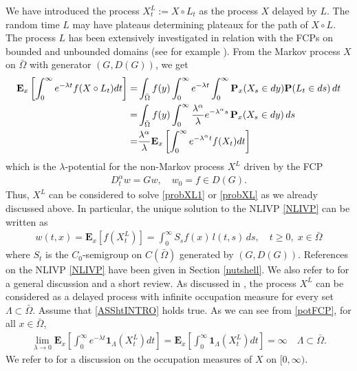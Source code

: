 \documentclass[11pt,a4paper]{article}
\begin{document}
We have introduced the process $X^L_t := X \circ L_t$ as the process $X$ delayed by $L$. The random time $L$ may have plateaus determining plateaux for the path of $X\circ L$. The process $L$ has been extensively investigated in relation with the FCPs on bounded and unbounded domains (see for example \cite{MNV09, Chen17}). From the Markov process $X$ on $\bar{\Omega}$ with generator $(G, D(G))$, we get 
\begin{align}
\label{potFCP}
\mathbf{E}_x\left[\int_0^\infty e^{-\lambda t} f(X \circ L_t) dt \right]
= & \int_{\bar{\Omega}} f(y) \int_0^\infty e^{-\lambda t} \int_0^\infty \mathbf{P}_x(X_s \in dy) \mathbf{P}(L_t \in ds)\, dt\notag \\
= & \int_{\bar{\Omega}} f(y)  \int_0^\infty \frac{\lambda^\alpha}{\lambda} e^{-\lambda^\alpha s}\, \mathbf{P}_x(X_s \in dy) \, ds \notag \\
= & \frac{\lambda^\alpha}{\lambda} \mathbf{E}_x \left[ \int_0^\infty e^{-\lambda^\alpha t} f(X_t) dt \right]
\end{align}
which is the $\lambda$-potential for the non-Markov process $X^L$ driven by the FCP 
\begin{align}
\label{NLIVP}
D^\alpha_t w = G w, \quad w_0 = f \in D(G).
\end{align}
Thus, $X^L$ can be considered to solve \eqref{probXL1} or \eqref{probXL} as we already discussed above. In particular, the unique solution to the NLIVP  \eqref{NLIVP} can be written as
\begin{align*}
w(t,x) = \mathbf{E}_x[f(X^L_t)] = \int_0^\infty S_s f(x)\, l(t,s)\,ds, \quad t\geq 0,\; x \in \bar{\Omega}
\end{align*}
where $S_t$ is the $C_0$-semigroup on $C(\bar{\Omega})$ generated by $(G,D(G))$. References on the NLIVP \eqref{NLIVP} have been given in Section \ref{nutshell}. We also refer to \cite{CapDovFEforms19} for a general discussion and a short review. As discussed in \cite{CapDovDelRus17}, the process $X^L$ can be considered as a delayed process with infinite occupation measure for every set $\Lambda \subset \bar{\Omega}$. Assume that \eqref{ASShtINTRO} holds true. As we can see from \eqref{potFCP}, for all $x \in \bar{\Omega}$,
\begin{align}
\lim_{\lambda \to 0} \mathbf{E}_x \left[ \int_0^\infty e^{-\lambda t}\mathbf{1}_\Lambda(X^L_t) dt \right] = \mathbf{E}_x \left[ \int_0^\infty \mathbf{1}_\Lambda(X^L_t) dt \right] = \infty \quad \Lambda \subset \bar{\Omega}.
\label{occupMeasXL}
\end{align}
We refer to \cite{NLBVP-ItheHline} for a discussion on the occupation measures of $X$ on $[0, \infty)$.
\end{document}
